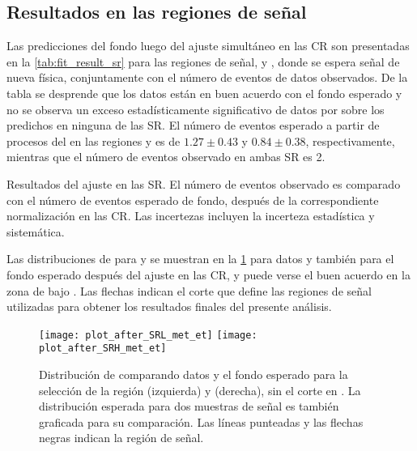 \subsection{Resultados en las regiones de señal}

Las predicciones del fondo luego del ajuste simultáneo en las CR son presentadas
en la \cref{tab:fit_result_sr} para las regiones de señal, {\SRL} y {\SRH},
donde se espera señal de nueva física, conjuntamente con el número de eventos de
datos observados. De la tabla se desprende que los datos están en
buen acuerdo con el fondo esperado y no se observa un exceso estadísticamente
significativo de datos por sobre los predichos en ninguna de las SR. El número
de eventos esperado a partir de procesos del {\SM} en las regiones {\SRL} y
{\SRH} es de $1.27\pm0.43$ y $0.84\pm0.38$, respectivamente, mientras que el
número de eventos observado en ambas SR es 2.

\begin{table}[!htbp]
  \centering

  \caption{Resultados del ajuste en las SR. El número de eventos observado es comparado con el número de
    eventos esperado de fondo, después de la correspondiente normalización en
    las CR. Las incertezas incluyen la incerteza estadística y sistemática.}
  \label{tab:fit_result_sr}

  

\end{table}


Las distribuciones de {\met} para {\SRL} y {\SRH} se muestran en la
\cref{fig:met_sr} para datos y también para el fondo esperado después del ajuste
en las CR, y puede verse el buen acuerdo en la zona de bajo {\met}. Las flechas
indican el corte que define las regiones de señal utilizadas para obtener los
resultados finales del presente análisis.


\begin{figure}[!htbp]

  \centering

  \texttt{[image: plot\_after\_SRL\_met\_et]} \hspace{1cm}
  \texttt{[image: plot\_after\_SRH\_met\_et]}

  \caption{Distribución de {\met} comparando datos y el fondo esperado para la
    selección de la región {\SRL} (izquierda) y {\SRH} (derecha), sin el corte
    en {\met}. La distribución esperada para dos muestras de señal es también
    graficada para su comparación. Las líneas punteadas y las flechas negras indican
    la región de señal.}
  \label{fig:met_sr}

\end{figure}

